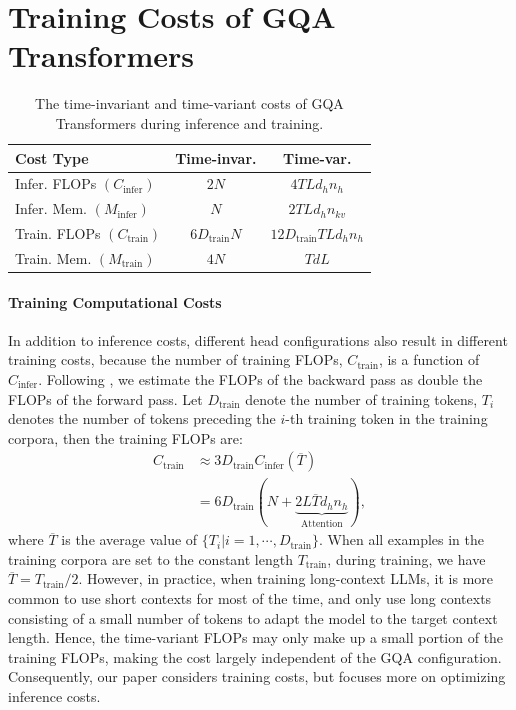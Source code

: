 \section{Training Costs of GQA Transformers}
\label{sec:appendix-training-costs}

\begin{table}[t]
    \centering
    \small
    \begin{tabular}{l|cc}
        \toprule
            \textbf{Cost Type}
            & \textbf{Time-invar.} 
            & \textbf{Time-var.}\\
        \midrule
        Infer. FLOPs $(C_\text{infer})$
            & $2N$ 
            & $4TLd_hn_{h}$  \\
        Infer. Mem. $(M_\text{infer})$ 
            & $N$ 
            & $2TLd_hn_{kv}$ \\
        \midrule
        Train. FLOPs $(C_\text{train})$  
            & $6D_\text{train}N$ 
            & $12D_\text{train}TLd_hn_{h}$ \\
        Train. Mem. $(M_\text{train})$
            & $4N$ 
            & $TdL$ \\
        \bottomrule
    \end{tabular}
    \caption{The time-invariant and time-variant costs of GQA Transformers during inference and training.}
    \label{tab:costs-full}
\end{table}


\paragraph{Training Computational Costs}

In addition to inference costs, different head configurations also result in different training costs, because the number of training FLOPs, $C_\text{train}$, is a function of $C_{\text{infer}}$.
Following \citet{scaling-law}, we estimate the FLOPs of the backward pass as double the FLOPs of the forward pass. Let $D_\text{train}$ denote the number of training tokens, $T_i$ denotes the number of tokens preceding the $i$-th training token in the training corpora, then the training FLOPs are:
\begin{align}
C_\text{train} 
    &\approx 3D_\text{train}C_{\text{infer}} \left(\overline T \right) \\
    &= 6D_\text{train} ( 
        N + \underbrace{2L \overline T d_h n_h}_\text{Attention}
    ),
    \label{eq:training-compute}
\end{align}
where $\overline T$ is the average value of $\{T_i|i=1, \cdots, D_\text{train}\}$. When all examples in the training corpora are set to the constant length $T_\text{train}$, during training, we have $\overline T = T_\text{train}/2$. However, in practice, when training long-context LLMs, it is more common to use short contexts for most of the time, and only use long contexts consisting of a small number of tokens to adapt the model to the target context length. Hence, the time-variant FLOPs may only make up a small portion of the training FLOPs, making the cost largely independent of the GQA configuration. Consequently, our paper considers training costs, but focuses more on optimizing inference costs.

